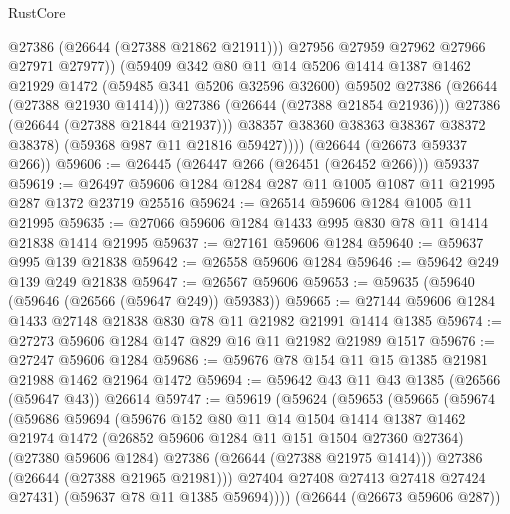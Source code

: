 \begin{lexlean}{RustCore}
\begin{coremodule}
                      @27386
                      (@26644 (@27388 @21862 @21911)))
                    @27956
                    @27959
                    @27962
                    @27966
                    @27971
                    @27977))
                (@59409
                  @342
                  @80
                  @11
                  @14
                  @5206
                  @1414
                  @1387
                  @1462
                  @21929
                  @1472
                  (@59485 @341 @5206 @32596 @32600)
                  @59502
                  @27386
                  (@26644 (@27388 @21930 @1414)))
                @27386
                (@26644 (@27388 @21854 @21936)))
              @27386
              (@26644 (@27388 @21844 @21937)))
            @38357
            @38360
            @38363
            @38367
            @38372
            @38378)
          (@59368 @987 @11 @21816 @59427))))
    (@26644 (@26673 @59337 @266))
@59606 := @26445 (@26447 @266 (@26451 (@26452 @266))) @59337
@59619 := @26497 @59606 @1284 @1284 @287 @11 @1005 @1087 @11 @21995 @287 @1372 @23719 @25516
@59624 := @26514 @59606 @1284 @1005 @11 @21995
@59635 := @27066 @59606 @1284 @1433 @995 @830 @78 @11 @1414 @21838 @1414 @21995
@59637 := @27161 @59606 @1284
@59640 := @59637 @995 @139 @21838
@59642 := @26558 @59606 @1284
@59646 := @59642 @249 @139 @249 @21838
@59647 := @26567 @59606
@59653 := @59635 (@59640 (@59646 (@26566 (@59647 @249)) @59383))
@59665 := @27144 @59606 @1284 @1433 @27148 @21838 @830 @78 @11 @21982 @21991 @1414 @1385
@59674 := @27273 @59606 @1284 @147 @829 @16 @11 @21982 @21989 @1517
@59676 := @27247 @59606 @1284
@59686 := @59676 @78 @154 @11 @15 @1385 @21981 @21988 @1462 @21964 @1472
@59694 := @59642 @43 @11 @43 @1385 (@26566 (@59647 @43)) @26614
@59747 := @59619
    (@59624
      (@59653
        (@59665
          (@59674
            (@59686
              @59694
              (@59676
                @152
                @80
                @11
                @14
                @1504
                @1414
                @1387
                @1462
                @21974
                @1472
                (@26852 @59606 @1284 @11 @151 @1504 @27360 @27364)
                (@27380 @59606 @1284)
                @27386
                (@26644 (@27388 @21975 @1414)))
              @27386
              (@26644 (@27388 @21965 @21981)))
            @27404
            @27408
            @27413
            @27418
            @27424
            @27431)
          (@59637 @78 @11 @1385 @59694))))
    (@26644 (@26673 @59606 @287))

\end{coremodule}
\end{lexlean}
